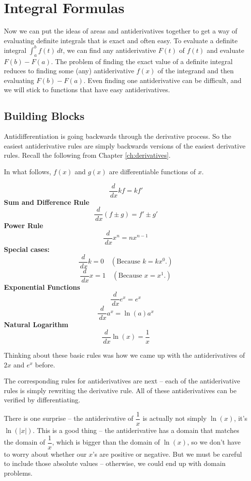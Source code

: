 \section{Integral Formulas}
\label{sec:formulas}
Now we can put the ideas of areas and antiderivatives together to get a way of evaluating definite integrals that is exact and often easy. To evaluate a definite integral $\displaystyle\int_a^b f(t)\,dt$, we can find any antiderivative $F(t)$ of $f(t)$ and evaluate $F(b)-F(a)$. The problem of finding the exact value of a definite integral reduces to finding some (any) antiderivative $f(x)$ of the integrand and then evaluating $F(b)-F(a)$. Even finding one antiderivative can be difficult, and we will stick to functions that have easy antiderivatives.

\subsection{Building Blocks}
Antidifferentiation is going backwards through the derivative process. So the easiest antiderivative rules are simply backwards versions of the easiest derivative rules. Recall the following from Chapter \ref{ch:derivatives}.

\begin{theorem}
In what follows, $f(x)$ and $g(x)$ are differentiable functions of $x$.

$$\dfrac{d}{\, dx }kf=kf'$$
{\bf Sum and Difference Rule}
$$\dfrac{d}{\, dx }(f\pm g)=f'\pm g'$$
{\bf Power Rule}
$$\dfrac{d}{\, dx }x^n=nx^{n-1}$$
{\bf Special cases:}
$$\dfrac{d}{\, dx }k = 0 \quad (\text{Because }k=kx^0.)$$
$$\dfrac{d}{\, dx }x = 1 \quad (\text{Because }x=x^1.)$$
{\bf Exponential Functions}
$$\dfrac{d}{\, dx }e^x=e^x$$
$$\dfrac{d}{\, dx }a^x=\ln(a)a^x$$
{\bf Natural Logarithm}
$$\dfrac{d}{\, dx }\ln(x)=\dfrac{1}{x}$$
\end{theorem}
Thinking about these basic rules was how we came up with the antiderivatives of $2x$ and $e^x$ before.

The corresponding rules for antiderivatives are next – each of the antiderivative rules is simply rewriting the derivative rule. All of these antiderivatives can be verified by differentiating.

There is one surprise – the antiderivative of $\dfrac{1}{x}$ is actually not simply $\ln(x)$, it's $\ln(|x|)$. This is a good thing – the antiderivative has a domain that matches the domain of $\dfrac{1}{x}$, which is bigger than the domain of $\ln(x)$, so we don’t have to worry about whether our $x$'s are positive or negative. But we must be careful to include those absolute values – otherwise, we could end up with domain problems.


